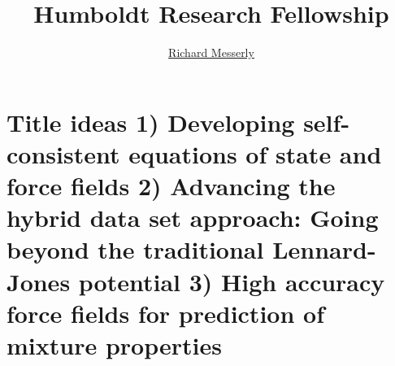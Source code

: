 \documentclass[12pt,a4paper]{article}
\begin{document}
	\thispagestyle{empty}
	\title{\Large \textbf{Humboldt Research Fellowship}}
	\author[1]{\large {\underline{Richard Messerly}}}%
	
	
	\date{} %
	\justify

%
%
%
%
%

\section*{Title ideas 1) Developing self-consistent equations of state and force fields 2) Advancing the hybrid data set approach: Going beyond the traditional Lennard-Jones potential 3) High accuracy force fields for prediction of mixture properties }
\end{document}
